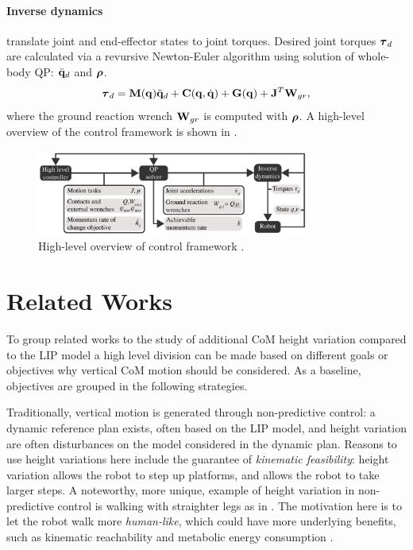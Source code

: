\paragraph{Inverse dynamics} translate joint and end-effector states to joint torques. Desired joint torques $\boldsymbol{\tau}_d$ are calculated via a revursive Newton-Euler algorithm using solution of whole-body \ac{QP}: $\ddot{\mathbf{q}}_d$ and $\boldsymbol{\rho}$.
\begin{equation}
    \boldsymbol{\tau}_d = \mathbf{M}(\mathbf{q})\ddot{\mathbf{q}}_d + \mathbf{C}(\mathbf{q},\dot{\mathbf{q}}) + \mathbf{G}(\mathbf{q}) + \mathbf{J}^T \mathbf{W}_{gr},
\end{equation}
where the ground reaction wrench $\mathbf{W}_{gr}$ is computed with $\boldsymbol{\rho}$. A high-level overview of the control framework is shown in .
\begin{figure}[h]
\centering
\includegraphics[width=0.8\textwidth]{STYLESTUFF/controlframework.png}
\caption{High-level overview of control framework \cite{koolen2016design}. }
\label{fig:framework}
\end{figure}

\section{Related Works}\label{sec:relatedworksheight}
To group related works to the study of additional \ac{CoM} height variation compared to the \ac{LIP} model a high level division can be made based on different goals or objectives why vertical \ac{CoM} motion should be considered. As a baseline, objectives are grouped in the following strategies. 

Traditionally, vertical motion is generated through non-predictive control: a dynamic reference plan exists, often based on the LIP model, and height variation are often disturbances on the model considered in the dynamic plan. Reasons to use height variations here include the guarantee of \textit{kinematic feasibility}: height variation allows the robot to step up platforms, and allows the robot to take larger steps. A noteworthy, more unique, example of height variation in non-predictive control is walking with straighter legs as in \cite{griffin2018straight}. The motivation here is to let the robot walk more \textit{human-like}, which could have more underlying benefits, such as kinematic reachability and metabolic energy consumption \cite{wang2012optimizing}.

